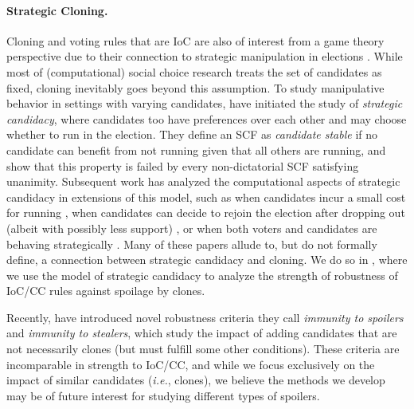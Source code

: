 \paragraph{Strategic Cloning.}
Cloning and voting rules that are IoC are also of interest from a game theory perspective due to their connection to strategic manipulation in elections \citep{Sornat21:Fine,Elkind10:Clone,Delemazure24:Generalizing,Caragiannis10:Socially}. While most of (computational) social choice research treats the set of candidates as fixed, cloning inevitably goes beyond this assumption. To study manipulative behavior in settings with varying candidates, \citet{Dutta01:Strategic,Dutta02:Successsive} have initiated the study of \emph{strategic candidacy}, where candidates too have preferences over each other and may choose whether to run in the election. They define an SCF as \emph{candidate stable} if no candidate can benefit from not running given that all others are running, and show that this property is failed by every non-dictatorial SCF satisfying unanimity. Subsequent work has analyzed the computational aspects of strategic candidacy in extensions of this model, such as when candidates incur a small cost for running \citep{Obraztsova15:Strategic}, when candidates can decide to rejoin the election after dropping out 
(albeit with possibly less support) 
\citep{Polukarov15:Convergence}, or when both voters and candidates are behaving strategically \citep{Brill15:Strategic}. Many of these papers allude to, but do not formally define, a connection between strategic candidacy and cloning. We do so in , where we use the model of strategic candidacy to analyze the strength of robustness of IoC/CC rules against spoilage by clones.

Recently, \citet{Holliday23:Split} have introduced novel robustness criteria they call \emph{immunity to spoilers} and \emph{immunity to stealers}, which study the impact of adding candidates that are not necessarily clones (but must fulfill some other conditions). These criteria are incomparable in strength to IoC/CC, and while we focus exclusively on the impact of similar candidates (\emph{i.e.}, clones), we believe the methods we develop may be of future interest for studying different types of spoilers.